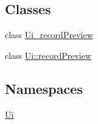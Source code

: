 \subsection*{Classes}
\begin{DoxyCompactItemize}
\item 
class \hyperlink{a00081}{Ui\+\_\+record\+Preview}
\item 
class \hyperlink{a00074}{Ui\+::record\+Preview}
\end{DoxyCompactItemize}
\subsection*{Namespaces}
\begin{DoxyCompactItemize}
\item 
 \hyperlink{a00145}{Ui}
\end{DoxyCompactItemize}
